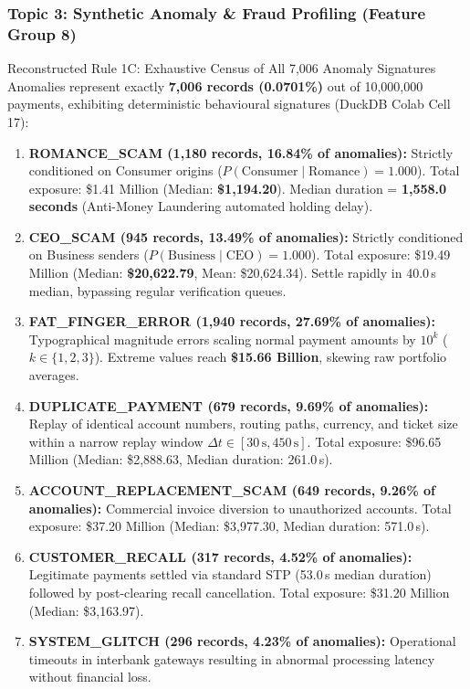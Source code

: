 \documentclass[11pt,a4paper]{article}
\begin{document}
\subsubsection{Topic 3: Synthetic Anomaly \& Fraud Profiling (Feature Group 8)}
\begin{rulebox}{Reconstructed Rule 1C: Exhaustive Census of All {7,006} Anomaly Signatures}
Anomalies represent exactly \textbf{7,006 records (0.0701\%)} out of 10,000,000 payments, exhibiting deterministic behavioural signatures (DuckDB Colab Cell 17):
\begin{enumerate}
    \item \textbf{ROMANCE\_SCAM (1,180 records, 16.84\% of anomalies):} Strictly conditioned on Consumer origins ($P(\text{Consumer} \mid \text{Romance}) = 1.000$). Total exposure: \$1.41 Million (Median: \textbf{\$1,194.20}). Median duration = \textbf{1,558.0 seconds} (Anti-Money Laundering automated holding delay).
    \item \textbf{CEO\_SCAM (945 records, 13.49\% of anomalies):} Strictly conditioned on Business senders ($P(\text{Business} \mid \text{CEO}) = 1.000$). Total exposure: \$19.49 Million (Median: \textbf{\$20,622.79}, Mean: \$20,624.34). Settle rapidly in 40.0\,s median, bypassing regular verification queues.
    \item \textbf{FAT\_FINGER\_ERROR (1,940 records, 27.69\% of anomalies):} Typographical magnitude errors scaling normal payment amounts by $10^k$ ($k \in \{1, 2, 3\}$). Extreme values reach \textbf{\$15.66 Billion}, skewing raw portfolio averages.
    \item \textbf{DUPLICATE\_PAYMENT (679 records, 9.69\% of anomalies):} Replay of identical account numbers, routing paths, currency, and ticket size within a narrow replay window $\Delta t \in [30\,\text{s}, 450\,\text{s}]$. Total exposure: \$96.65 Million (Median: \$2,888.63, Median duration: 261.0\,s).
    \item \textbf{ACCOUNT\_REPLACEMENT\_SCAM (649 records, 9.26\% of anomalies):} Commercial invoice diversion to unauthorized accounts. Total exposure: \$37.20 Million (Median: \$3,977.30, Median duration: 571.0\,s).
    \item \textbf{CUSTOMER\_RECALL (317 records, 4.52\% of anomalies):} Legitimate payments settled via standard STP (53.0\,s median duration) followed by post-clearing recall cancellation. Total exposure: \$31.20 Million (Median: \$3,163.97).
    \item \textbf{SYSTEM\_GLITCH (296 records, 4.23\% of anomalies):} Operational timeouts in interbank gateways resulting in abnormal processing latency without financial loss.
\end{enumerate}
\end{rulebox}
\end{document}
